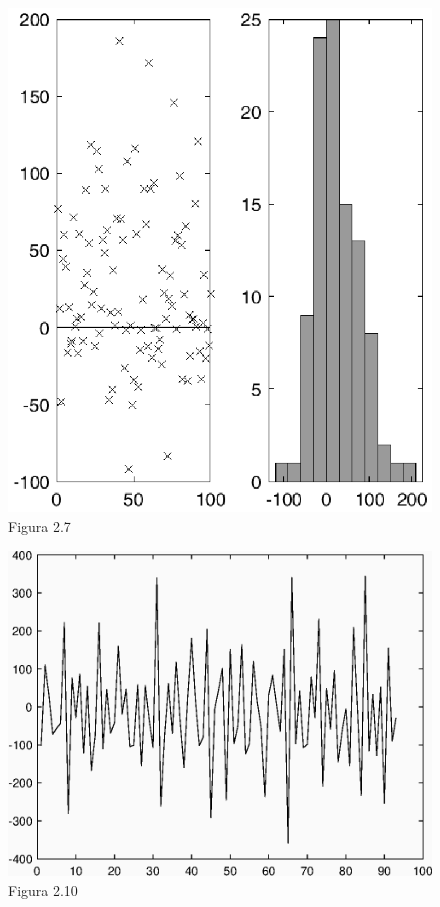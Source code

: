 \documentclass[a4paper, 12pt]{article}
\begin{document}
\begin{figure}[h!]
	\centering
	\includegraphics{fig27}
	\caption*{Figura 2.7}
\end{figure} 

\begin{figure}[h!]
	\centering
	\includegraphics{fig210}
	\caption*{Figura 2.10}
\end{figure} 
\clearpage
\end{document}
